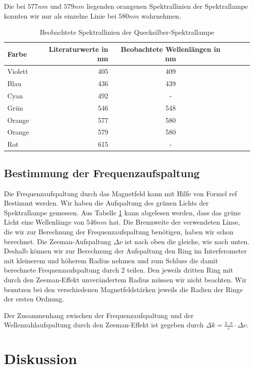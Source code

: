 \documentclass[10pt,a4paper]{article}
\begin{document}
Die bei $577nm$ und $579nm$ liegenden orangenen Spektrallinien der Spektrallampe konnten wir nur als einzelne Linie bei $580nm$ wahrnehmen.

\begin{table}[h!]
	\centering
\begin{tabular}{|l|r|c|lrp{16cm}}\hline
	Farbe & Literaturwerte in nm & Beobachtete Wellenlängen in nm\\\hline
	Violett & 405 & 409\\
	Blau & 436 & 439\\
	Cyan & 492 & -\\
	Grün & 546 & 548\\
	Orange & 577 & 580\\
	Orange & 579 & 580\\
	Rot & 615 & -\\\hline
\end{tabular}
	\caption{Beobachtete Spektrallinien der Quecksilber-Spektrallampe}
	\label{spektrum}
\end{table}


\subsection{Bestimmung der Frequenzaufspaltung}

Die Frequenzaufspaltung durch das Magnetfeld kann mit Hilfe von Formel ref Bestimmt werden. Wir haben die Aufspaltung des grünen Lichts der Spektrallampe gemessen. Aus Tabelle \ref{spektrum} kann abgelesen werden, dass das grüne Licht eine Wellenlänge von $546 nm$ hat. Die Brennweite der verwendeten Linse, die wir zur Berechnung der Frequenzaufspaltung benötigen, haben wir schon berechnet.
Die Zeeman-Aufspaltung $\Delta\nu$ ist nach oben die gleiche, wie nach unten. Deshalb können wir zur Berechnung der Aufspaltung den Ring im Interferometer mit kleinerem und höherem Radius nehmen und zum Schluss die damit berechnete Frequenzaufspaltung durch 2 teilen. Den jeweils dritten Ring mit durch den Zeeman-Effekt unverändertem Radius müssen wir nicht beachten. Wir benutzen bei den verschiedenen Magnetfeldstärken jeweils die Radien der Ringe der ersten Ordnung. 

Der Zusammenhang zwischen der Frequenzaufspaltung und der Wellenzahlaufspaltung durch den Zeeman-Effekt ist gegeben durch $\Delta k = \frac{2 \cdot \pi}{c} \cdot \Delta\nu$.











\section{Diskussion}
\end{document}
